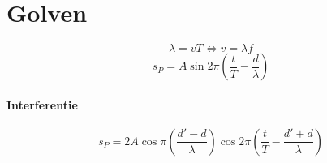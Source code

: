 \newpage
\section{Golven}
\label{sec:Golven}
\[ \lambda = v T \Leftrightarrow v = \lambda f\]
\[ s_P = A \sin 2\pi\left(\frac{t}{T}-\frac{d}{\lambda}\right)\]

\paragraph{Interferentie}
\label{sec:Interferentie}
\[ s_P = 2A \cos \pi\left(\frac{d' - d}{\lambda} \right) \cos 2\pi\left(\frac{t}{T} - \frac{d' + d}{\lambda} \right)\]


